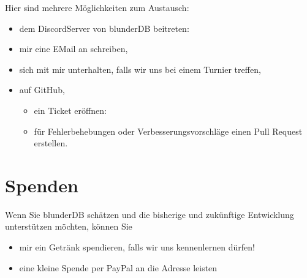 \documentclass[letterpaper,10pt,german]{sphinxmanual}
\begin{document}
\sphinxAtStartPar
Hier sind mehrere Möglichkeiten zum Austausch:
\begin{itemize}
\item {} 
\sphinxAtStartPar
dem Discord\sphinxhyphen{}Server von blunderDB beitreten: 

\item {} 
\sphinxAtStartPar
mir eine E\sphinxhyphen{}Mail an  schreiben,

\item {} 
\sphinxAtStartPar
sich mit mir unterhalten, falls wir uns bei einem Turnier treffen,

\item {} 
\sphinxAtStartPar
auf GitHub,
\begin{itemize}
\item {} 
\sphinxAtStartPar
ein Ticket eröffnen: 

\item {} 
\sphinxAtStartPar
für Fehlerbehebungen oder Verbesserungsvorschläge einen Pull Request erstellen.

\end{itemize}

\end{itemize}


\chapter{Spenden}
\label{\detokenize{index:faire-un-don}}
\sphinxAtStartPar
Wenn Sie blunderDB schätzen und die bisherige und zukünftige Entwicklung unterstützen möchten, können Sie
\begin{itemize}
\item {} 
\sphinxAtStartPar
mir ein Getränk spendieren, falls wir uns kennenlernen dürfen!

\item {} 
\sphinxAtStartPar
eine kleine Spende per PayPal an die Adresse  leisten

\end{itemize}
\end{document}
